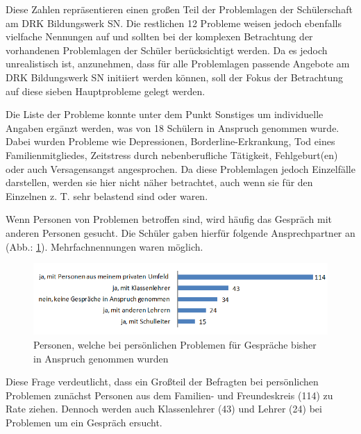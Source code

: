 \noindent
Diese Zahlen repräsentieren einen großen Teil der Problemlagen der Schülerschaft am DRK Bildungswerk SN. Die restlichen 12 Probleme weisen jedoch ebenfalls vielfache Nennungen auf und sollten bei der komplexen Betrachtung der vorhandenen Problemlagen der Schüler berücksichtigt werden. Da es jedoch unrealistisch ist, anzunehmen, dass für alle Problemlagen passende Angebote am DRK Bildungswerk SN initiiert werden können, soll der Fokus der Betrachtung auf diese sieben Hauptprobleme gelegt werden.

Die Liste der Probleme konnte unter dem Punkt Sonstiges um individuelle Angaben ergänzt werden, was von 18 Schülern in Anspruch genommen wurde. Dabei wurden Probleme wie Depressionen, Bor\-der\-line-Er\-kran\-kung, Tod eines Familienmitgliedes, Zeitstress durch nebenberufliche Tätigkeit, Fehlgeburt(en) oder auch Versagensangst angesprochen. Da diese Problemlagen jedoch Einzelfälle darstellen, werden sie hier nicht näher betrachtet, auch wenn sie für den Einzelnen z. T. sehr belastend sind oder waren.

Wenn Personen von Problemen betroffen sind, wird häufig das Gespräch mit anderen Personen gesucht. Die Schüler gaben hierfür folgende Ansprechpartner an (Abb.: \ref{fig:welche-Personen-wurden-bisher bei-persoenlichen-Problemen-in-der-zurueckliegenden-Ausbildungszeit-fuer-Gespraeche-in-Anspruch-genommen}). Mehrfachnennungen waren möglich. 

\begin{figure}[ht]
	\centering
		\includegraphics[width=1.0\textwidth]{images/welche-Personen-wurden-bisher-bei-persoenlichen-Problemen-in-der-zurueckliegenden-Ausbildungszeit-fuer-Gespraeche-in-Anspruch-genommen.png}
	\caption{Personen, welche bei persönlichen Problemen für Gespräche bisher in Anspruch genommen wurden}
	\label{fig:welche-Personen-wurden-bisher bei-persoenlichen-Problemen-in-der-zurueckliegenden-Ausbildungszeit-fuer-Gespraeche-in-Anspruch-genommen}
\end{figure}

\noindent
Diese Frage verdeutlicht, dass ein Großteil der Befragten bei persönlichen Problemen zunächst Personen aus dem Familien- und Freundeskreis (114) zu Rate ziehen. Dennoch werden auch Klassenlehrer (43) und Lehrer (24) bei Problemen um ein Gespräch ersucht.

